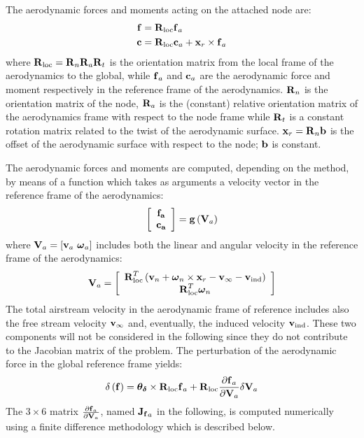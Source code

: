 The aerodynamic forces and moments acting on the attached node are:
\begin{subequations}
\begin{align}
	\T{f} &= \T{R}_{\text{loc}} \T{f}_a\\ 
	\T{c} &= \T{R}_{\text{loc}} \T{c}_a + \T{x}_r\times\T{f}_a 
\end{align}
\end{subequations}
where $\T{R}_{\text{loc}} = \T{R}_n\T{R}_a\T{R}_t$ is the orientation 
matrix from the local frame of the aerodynamics to the global, 
while $\T{f}_a$ and $\T{c}_a$ are the aerodynamic force and moment 
respectively in the reference frame of the aerodynamics. $\T{R}_n$
is the orientation matrix of the node, $\T{R}_a$ is the (constant) 
relative orientation matrix of the aerodynamics frame with respect 
to the node frame while $\T{R}_t$ is a constant rotation matrix 
related to the twist of the aerodynamic surface. $\T{x}_r = \T{R}_n\T{b}$ 
is the offset of the aerodynamic surface with respect to the node; 
$\T{b}$ is constant.

The aerodynamic forces and moments are computed, depending on the method, 
by means of a function which takes as arguments a velocity vector
in the reference frame of the aerodynamics:
\begin{equation}
	\sqbr{\matr{c}{\T{f_a}\\\T{c_a}}} = \T{g}\plbr{\T{V}_{a}}
\end{equation}
where $\T{V}_{a} = \sqbr{\T{v}_a\ \T{\omega}_a}$ includes both the 
linear and angular velocity in the reference frame of the aerodynamics:
\begin{equation}
	\T{V}_{a} = \sqbr{\matr{c}{
		\T{R}^T_{\text{loc}} \plbr{\T{v}_n + \T{\omega}_n\times\T{x}_r - \T{v}_{\infty} - \T{v}_{\text{ind}}}\\
		\T{R}^T_{\text{loc}} \T{\omega}_n
		}}
\end{equation}
The total airstream velocity in the aerodynamic frame of reference 
includes also the free stream velocity $\T{v}_{\infty}$ and, eventually, 
the induced velocity $\T{v}_{\text{ind}}$. These two components will not be 
considered in the following since they do not contribute to the 
Jacobian matrix of the problem. 
The perturbation of the aerodynamic force in the global reference frame
yields:
\begin{equation}
	\delta\plbr{\T{f}} = \T{\theta_{\delta}}\times\T{R}_{\text{loc}}\T{f}_a + 
				\T{R}_{\text{loc}}\frac{\partial\T{f}_a}{\partial\T{V}_a}
				\delta\T{V}_a
\end{equation}
The $3\times6$ matrix $\frac{\partial\T{f}_a}{\partial\T{V}_a}$, 
named $\T{J_f}_a$ in the
following, is computed numerically using a finite difference methodology
which is described below.

